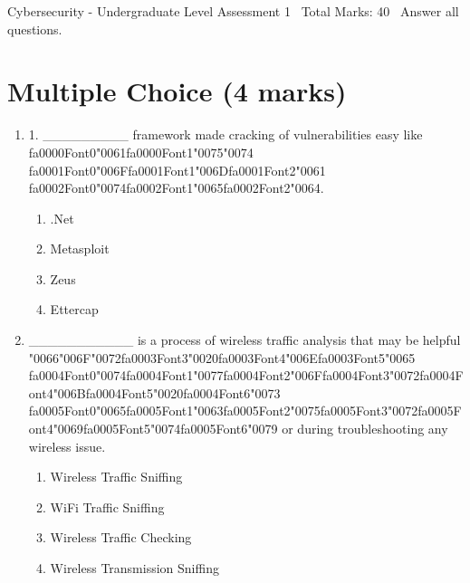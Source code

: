 \documentclass[12pt]{article}
\begin{document}
\begin{center}
Cybersecurity - Undergraduate Level Assessment 1 \
Total Marks: 40 \
Answer all questions.
\end{center}

\section*{Multiple Choice (4 marks)}
\begin{enumerate}[label=\arabic*.]
\item 1. \_\_\_\_\_\_\_\_\_ framework made cracking of vulnerabilities easy like {\csname fa0000Font0\endcsname\char"0061}{\csname fa0000Font1\endcsname\char"0075}{\char"0074} {\csname fa0001Font0\endcsname\char"006F}{\csname fa0001Font1\endcsname\char"006D}{\csname fa0001Font2\endcsname\char"0061} {\csname fa0002Font0\endcsname\char"0074}{\csname fa0002Font1\endcsname\char"0065}{\csname fa0002Font2\endcsname\char"0064}.
\begin{enumerate}[label=(\alph*)]
    \item .Net
    \item Metasploit
    \item Zeus
    \item Ettercap
\end{enumerate}
\item \_\_\_\_\_\_\_\_\_\_\_ is a process of wireless traffic analysis that may be helpful {\char"0066}{\char"006F}{\char"0072}{\csname fa0003Font3\endcsname\char"0020}{\csname fa0003Font4\endcsname\char"006E}{\csname fa0003Font5\endcsname\char"0065} {\csname fa0004Font0\endcsname\char"0074}{\csname fa0004Font1\endcsname\char"0077}{\csname fa0004Font2\endcsname\char"006F}{\csname fa0004Font3\endcsname\char"0072}{\csname fa0004Font4\endcsname\char"006B}{\csname fa0004Font5\endcsname\char"0020}{\csname fa0004Font6\endcsname\char"0073} {\csname fa0005Font0\endcsname\char"0065}{\csname fa0005Font1\endcsname\char"0063}{\csname fa0005Font2\endcsname\char"0075}{\csname fa0005Font3\endcsname\char"0072}{\csname fa0005Font4\endcsname\char"0069}{\csname fa0005Font5\endcsname\char"0074}{\csname fa0005Font6\endcsname\char"0079} or during troubleshooting any wireless issue.
\begin{enumerate}[label=(\alph*)]
    \item Wireless Traffic Sniffing
    \item WiFi Traffic Sniffing
    \item Wireless Traffic Checking
    \item Wireless Transmission Sniffing
\end{enumerate}
\end{enumerate}
\end{document}

